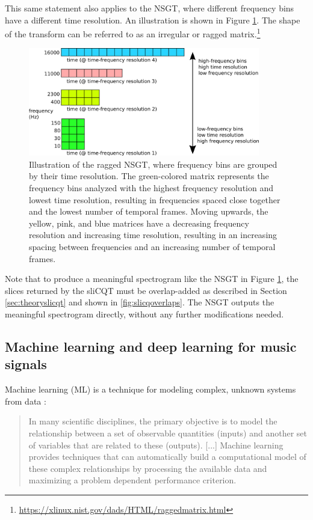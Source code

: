 \documentclass[report.tex]{subfiles}
\begin{document}
This same statement also applies to the NSGT, where different frequency bins have a different time resolution. An illustration is shown in Figure \ref{fig:raggedslicqt}. The shape of the transform can be referred to as an irregular or ragged matrix.\footnote{\url{https://xlinux.nist.gov/dads/HTML/raggedmatrix.html}}

\begin{figure}[ht]
	\centering
	\includegraphics[width=0.9\textwidth]{./images-misc/slicq_shape.png}
	\caption{Illustration of the ragged NSGT, where frequency bins are grouped by their time resolution. The green-colored matrix represents the frequency bins analyzed with the highest frequency resolution and lowest time resolution, resulting in frequencies spaced close together and the lowest number of temporal frames. Moving upwards, the yellow, pink, and blue matrices have a decreasing frequency resolution and increasing time resolution, resulting in an increasing spacing between frequencies and an increasing number of temporal frames.}
	\label{fig:raggedslicqt}
\end{figure}

Note that to produce a meaningful spectrogram like the NSGT in Figure \ref{fig:raggedslicqt}, the slices returned by the sliCQT must be overlap-added as described in Section \ref{sec:theoryslicqt} and shown in \ref{fig:slicqoverlaps}. The NSGT outputs the meaningful spectrogram directly, without any further modifications needed.

\newpagefill

\subsection{Machine learning and deep learning for music signals}
\label{sec:ml}

Machine learning (ML) is a technique for modeling complex, unknown systems from data \parencite[105]{introtoml}:

\begin{quote}
	In many scientific disciplines, the primary objective is to model the relationship between a set of observable quantities (inputs) and another set of variables that are related to these (outputs). [...] Machine learning provides techniques that can automatically build a computational model of these complex relationships by processing the available data and maximizing a problem dependent performance criterion.
\end{quote}
\end{document}
